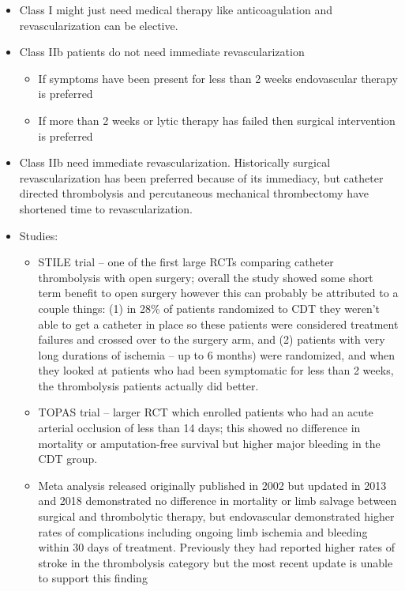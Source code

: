 \documentclass[
]{book}
\begin{document}
\begin{itemize}
\item
  Class I might just need medical therapy like anticoagulation and
  revascularization can be elective.~
\item
  Class IIb patients do not need immediate revascularization

  \begin{itemize}
  \item
    If symptoms have been present for less than 2 weeks endovascular
    therapy is preferred
  \item
    If more than 2 weeks or lytic therapy has failed then surgical
    intervention is preferred~
  \end{itemize}
\item
  Class IIb need immediate revascularization. Historically surgical
  revascularization has been preferred because of its immediacy, but
  catheter directed thrombolysis and percutaneous mechanical
  thrombectomy have shortened time to revascularization.~
\item
  Studies:

  \begin{itemize}
  \item
    STILE trial -- one of the first large RCTs comparing catheter
    thrombolysis with open surgery; overall the study showed some
    short term benefit to open surgery however this can probably be
    attributed to a couple things: (1) in 28\% of patients randomized
    to CDT they weren't able to get a catheter in place so these
    patients were considered treatment failures and crossed over to
    the surgery arm, and (2) patients with very long durations of
    ischemia -- up to 6 months) were randomized, and when they
    looked at patients who had been symptomatic for less than 2
    weeks, the thrombolysis patients actually did better.
    \citep{thestileinvestigatorsResultsProspectiveRandomized1994}
  \item
    TOPAS trial -- larger RCT which enrolled patients who had an
    acute arterial occlusion of less than 14 days; this showed no
    difference in mortality or amputation-free survival but higher
    major bleeding in the CDT group.
    \citep{ourielComparisonRecombinantUrokinase1998a}
  \item
    Meta analysis released originally published in 2002 but updated
    in 2013 and 2018 demonstrated no difference in mortality or limb
    salvage between surgical and thrombolytic therapy, but
    endovascular demonstrated higher rates of complications
    including ongoing limb ischemia and bleeding within 30 days of
    treatment. Previously they had reported higher rates of stroke
    in the thrombolysis category but the most recent update is
    unable to support this finding
    \citep{darwoodSurgeryThrombolysisInitial2018}


\end{itemize}
\end{itemize}
\end{document}
